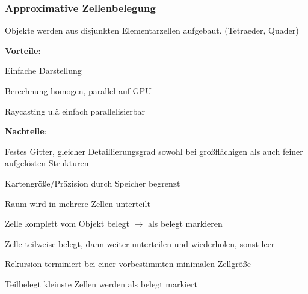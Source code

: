\subsubsection{Approximative Zellenbelegung}
Objekte werden aus disjunkten Elementarzellen aufgebaut. (Tetraeder, Quader)
\begin{compactitem}
    \item \textbf{Vorteile}:
    \begin{compactitem}
        \item Einfache Darstellung
        \item Berechnung homogen, parallel auf GPU
        \item Raycasting u.ä einfach parallelisierbar
    \end{compactitem}
    \item \textbf{Nachteile}:
    \begin{compactitem}
        \item Festes Gitter, gleicher Detaillierungsgrad sowohl bei großflächigen als auch feiner
        aufgelösten Strukturen
        \item Kartengröße/Präzision durch Speicher begrenzt
    \end{compactitem}
\end{compactitem}
\begin{compactitem}
    \item Raum wird in mehrere Zellen unterteilt
    \item Zelle komplett vom Objekt belegt $\rightarrow$ als belegt markieren
    \item Zelle teilweise belegt, dann weiter unterteilen und wiederholen, sonst leer
    \item Rekursion terminiert bei einer vorbestimmten minimalen Zellgröße
    \item Teilbelegt kleinste Zellen werden als belegt markiert
\end{compactitem}
